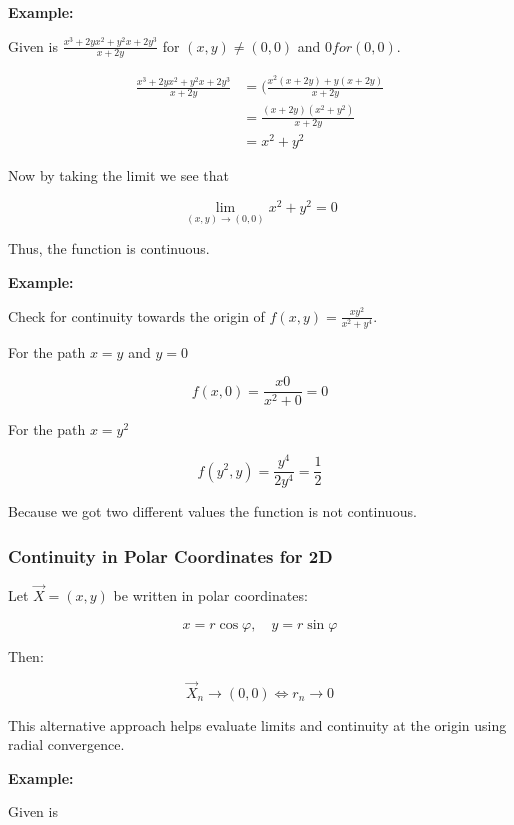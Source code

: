 \textbf{Example:}
\vspace{\baselineskip}

Given is \(\frac{x^3 + 2yx^2 + y^2x + 2y^3}{x + 2y}\) for \((x,y) \ne (0,0)\) and \(0 for (0,0)\).

\begin{align*}
    \frac{x^3 + 2yx^2 + y^2x + 2y^3}{x + 2y} &= (\frac{x^2(x + 2y) + y(x + 2y)}{x + 2y}\\
    &= \frac{(x + 2y)(x^2 + y^2)}{x + 2y}\\
    &= x^2 + y^2
\end{align*}

Now by taking the limit we see that

\[
    \lim_{(x,y) \to (0,0)} x^2 + y^2 = 0
\]

Thus, the function is continuous.
\vspace{\baselineskip}

\textbf{Example:}
\vspace{\baselineskip}

Check for continuity towards the origin of \(f(x,y) =\frac{xy^2}{x^2 + y^4}\).
\vspace{\baselineskip}

For the path \(x = y\) and \(y = 0\)

\[
    f(x,0) = \frac{x0}{x^2 + 0} = 0
\]

For the path \(x = y^2\)

\[
    f(y^2, y) = \frac{y^4}{2y^4} = \frac{1}{2}
\]

Because we got two different values the function is not continuous.

\subsubsection{Continuity in Polar Coordinates for 2D}

Let \( \vec{X} = (x, y) \) be written in polar coordinates:

\[
    x = r \cos \varphi, \quad y = r \sin \varphi
\]

Then:

\[
    \vec{X}_n \to (0, 0) \iff r_n \to 0
\]

This alternative approach helps evaluate limits and continuity at the origin using radial convergence.
\vspace{\baselineskip}

\textbf{Example:}
\vspace{\baselineskip}

Given is 

